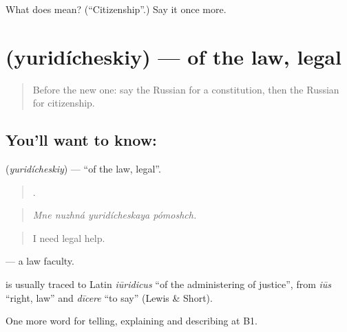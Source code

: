 \begin{tcolorbox}[breakable,colback=teal!4,colframe=teal!35!black,title={Before you move on}]
What does  mean? (\textquotedblleft{}Citizenship\textquotedblright{}.) Say it once more.
\end{tcolorbox}
\section[\texorpdfstring{\ru{юридический} (yuridícheskiy)}{юридический (yuridícheskiy)}]{ (yuridícheskiy) — of the law, legal}

\label{lesson:RU-C391-yuridicheskiy}



\begin{quote}
Before the new one: say the Russian for a constitution, then the Russian for citizenship.
\end{quote}

\subsection*{You'll want to know: }
\textbf{} (\emph{yuridícheskiy}) — \textquotedblleft{}of the law, legal\textquotedblright{}.

\begin{quote}
   .
\end{quote}

\begin{quote}
\emph{Mne nuzhná yuridícheskaya pómoshch.}
\end{quote}

\begin{quote}
I need legal help.
\end{quote}

\emph{ } — a law faculty.

\begin{cousinweb}
\textbf{} is usually traced to Latin \emph{iūridicus} \textquotedblleft{}of the administering of justice\textquotedblright{}, from \emph{iūs} \textquotedblleft{}right, law\textquotedblright{} and \emph{dīcere} \textquotedblleft{}to say\textquotedblright{} (Lewis \& Short).
\end{cousinweb}

\begin{grammarlens}[title={What you've built}]
One more word for telling, explaining and describing at B1.
\end{grammarlens}

